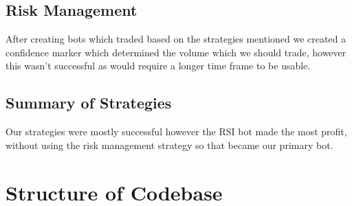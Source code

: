 \documentclass[a4paper12pt, twocolumn]{article}
\begin{document}
\subsection{Risk Management}
After creating bots which traded based on the strategies mentioned we created a confidence marker which determined the volume which we should trade, however this wasn't successful as would require a longer time frame to be usable.
\subsection{Summary of Strategies}
Our strategies were mostly successful however the RSI bot made the most profit, without using the risk management strategy so that became our primary bot.

\section{Structure of Codebase}
\end{document}
